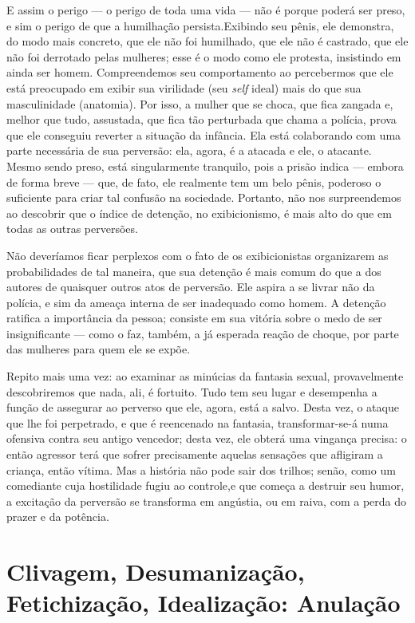 E assim o perigo --- o perigo de toda uma vida --- não é porque
poderá ser preso, e sim o perigo de que a humilhação persista.\idxexibiexpo[|)] Exibindo
seu pênis, ele demonstra, do modo mais concreto, que ele não foi
humilhado, que ele não é castrado,\idxcastaexib{} que ele não foi derrotado pelas
mulheres; esse é o modo como ele protesta, insistindo em ainda ser
homem. Compreendemos seu comportamento ao percebermos que ele está
preocupado em exibir sua virilidade (seu \textit{self} ideal) mais do
que sua masculinidade (anatomia). Por isso, a mulher que se choca, que
fica zangada e, melhor que tudo, assustada, que fica tão perturbada que
chama a polícia, prova que ele conseguiu reverter a situação da
infância. Ela está colaborando com uma parte necessária de sua
perversão: ela, agora, é a atacada e ele, o atacante. Mesmo sendo
preso, está singularmente tranquilo, pois a prisão indica --- embora
de forma breve --- que, de fato, ele realmente tem um belo pênis,
poderoso o suficiente para criar tal confusão na sociedade. Portanto,
não nos surpreendemos ao descobrir que o índice de detenção, no
exibicionismo, é mais alto do que em todas as outras perversões.

Não deveríamos ficar perplexos com o fato de os exibicionistas
organizarem as probabilidades de tal maneira, que sua detenção é mais
comum do que a dos autores de quaisquer outros atos de perversão.\idxexibicond{} Ele
aspira a se livrar não da polícia, e sim da ameaça interna de ser
inadequado como homem. A detenção ratifica a importância da pessoa;
consiste em sua vitória sobre o medo de ser insignificante --- como o
faz, também, a já esperada reação de choque, por parte das mulheres
para quem ele se expõe.

Repito mais uma vez: ao examinar as minúcias da fantasia sexual,
provavelmente descobriremos que nada, ali, é fortuito. Tudo tem seu
lugar e desempenha a função de assegurar ao perverso que ele, agora,
está a salvo. Desta vez, o ataque que lhe foi perpetrado, e que é
reencenado na fantasia, transformar-se-á numa ofensiva contra seu
antigo vencedor; desta vez, ele obterá uma vingança precisa: o então
agressor terá que sofrer precisamente aquelas sensações que afligiram a
criança, então vítima. Mas a história não pode sair dos trilhos; senão,
como um comediante cuja hostilidade fugiu ao controle,\idxexibi[|)] e que começa a
destruir seu humor, a excitação da perversão se transforma em angústia,
ou em raiva, com a perda do prazer e da potência.

\section{Clivagem, Desumanização, Fetichização, Idealização: Anulação}


